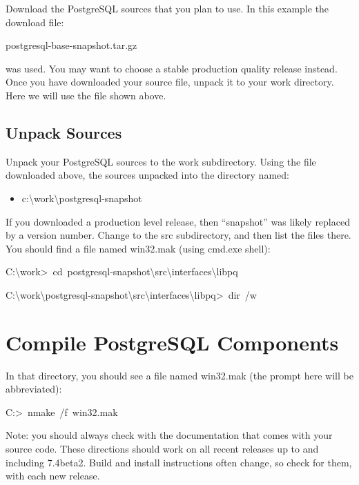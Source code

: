 \documentclass[english]{report}
\newenvironment{lyxcode}
   {\begin{list}{}{
     \setlength{\rightmargin}{\leftmargin}
     \setlength{\listparindent}{0pt}%
     \raggedright
     \setlength{\itemsep}{0pt}
     \setlength{\parsep}{0pt}
     \normalfont\ttfamily}%
    \item[]}
   {\end{list}}
\begin{document}
Download the PostgreSQL sources that you plan to use. In this example
the download file:

\begin{lyxcode}
postgresql-base-snapshot.tar.gz
\end{lyxcode}
was used. You may want to choose a stable production quality release
instead. Once you have downloaded your source file, unpack it to your
work directory. Here we will use the file shown above.


\subsection{Unpack Sources}

Unpack your PostgreSQL sources to the work subdirectory. Using the
file downloaded above, the sources unpacked into the directory named:

\begin{itemize}
\item c:\textbackslash{}work\textbackslash{}postgresql-snapshot
\end{itemize}
If you downloaded a production level release, then {}``snapshot''
was likely replaced by a version number. Change to the src subdirectory,
and then list the files there. You should find a file named win32.mak
(using cmd.exe shell):

\begin{lyxcode}


{\footnotesize C:\textbackslash{}work>~cd~postgresql-snapshot\textbackslash{}src\textbackslash{}interfaces\textbackslash{}libpq}{\footnotesize \par}

{\footnotesize C:\textbackslash{}work\textbackslash{}postgresql-snapshot\textbackslash{}src\textbackslash{}interfaces\textbackslash{}libpq>~dir~/w}{\footnotesize \par}


\end{lyxcode}

\section{Compile PostgreSQL Components}

In that directory, you should see a file named win32.mak (the prompt
here will be abbreviated):

\begin{lyxcode}
{\footnotesize C:>~nmake~/f~win32.mak}{\footnotesize \par}
\end{lyxcode}
Note: you should always check with the documentation that comes with
your source code. These directions should work on all recent releases
up to and including 7.4beta2. Build and install instructions often
change, so check for them, with each new release.
\end{document}
